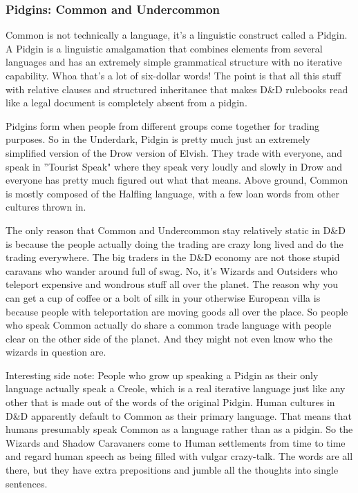 \subsubsection{Pidgins: Common and Undercommon}
\vspace*{-8pt}

Common is not technically a language, it's a linguistic construct called a Pidgin. A Pidgin is a linguistic amalgamation that combines elements from several languages and has an extremely simple grammatical structure with no iterative capability. Whoa that's a lot of six-dollar words! The point is that all this stuff with relative clauses and structured inheritance that makes D\&D rulebooks read like a legal document is completely absent from a pidgin.

Pidgins form when people from different groups come together for trading purposes. So in the Underdark, Pidgin is pretty much just an extremely simplified version of the Drow version of Elvish. They trade with everyone, and speak in ''Tourist Speak" where they speak very loudly and slowly in Drow and everyone has pretty much figured out what that means. Above ground, Common is mostly composed of the Halfling language, with a few loan words from other cultures thrown in.

The only reason that Common and Undercommon stay relatively static in D\&D is because the people actually doing the trading are crazy long lived and do the trading everywhere. The big traders in the D\&D economy are not those stupid caravans who wander around full of swag. No, it's Wizards and Outsiders who teleport expensive and wondrous stuff all over the planet. The reason why you can get a cup of coffee or a bolt of silk in your otherwise European villa is because people with teleportation are moving goods all over the place. So people who speak Common actually do share a common trade language with people clear on the other side of the planet. And they might not even know who the wizards in question are.

Interesting side note: People who grow up speaking a Pidgin as their only language actually speak a Creole, which is a real iterative language just like any other that is made out of the words of the original Pidgin. Human cultures in D\&D apparently default to Common as their primary language. That means that humans presumably speak Common as a language rather than as a pidgin. So the Wizards and Shadow Caravaners come to Human settlements from time to time and regard human speech as being filled with vulgar crazy-talk. The words are all there, but they have extra prepositions and jumble all the thoughts into single sentences.


